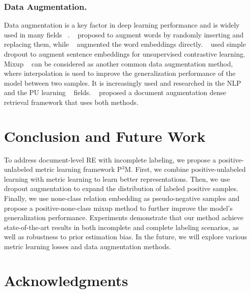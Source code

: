 \documentclass[letterpaper]{article} %
\begin{document}
\subsubsection{Data Augmentation.}
Data augmentation is a key factor in deep learning performance and is widely used in many fields ~\cite{DBLP:journals/jbd/ShortenK19,DBLP:conf/naacl/HedderichLASK21}. ~\cite{DBLP:conf/emnlp/WeiZ19,ma2019nlpaug} proposed to augment words by randomly inserting and replacing them, while ~\cite{DBLP:conf/acl/LeeKLH20} augmented the word embeddings directly. ~\cite{DBLP:conf/emnlp/GaoYC21} used simple dropout to augment sentence embeddings for unsupervised contrastive learning. Mixup ~\cite{DBLP:conf/iclr/ZhangCDL18,DBLP:conf/icml/VermaLBNMLB19} can be considered as another common data augmentation method, where interpolation is used to improve the generalization performance of the model between two samples. It is increasingly used and researched in the NLP ~\cite{DBLP:conf/acl/ChenYY20,DBLP:conf/acl/YinWQX21,DBLP:conf/naacl/WuX0ZMXZ22} and the PU learning ~\cite{DBLP:conf/nips/ChenLWZW20,DBLP:journals/corr/abs-2004-09388,DBLP:conf/iclr/LiLFO22,DBLP:conf/cvpr/ZhaoXJWH22} fields. ~\cite{DBLP:conf/acl/JeongBCHP22} proposed a document augmentation dense retrieval framework that uses both methods.

\section{Conclusion and Future Work}

To address document-level RE with incomplete labeling, we propose a positive-unlabeled metric learning framework P$^{3}$M. First, we combine positive-unlabeled learning with metric learning to learn better representations. Then, we use dropout augmentation to expand the distribution of labeled positive samples. Finally, we use none-class relation embedding as pseudo-negative samples and propose a positive-none-class mixup method to further improve the model's generalization performance. Experiments demonstrate that our method achieve state-of-the-art results in both incomplete and complete labeling scenarios, as well as robustness to prior estimation bias. In the future, we will explore various metric learning losses and data augmentation methods.

\section{Acknowledgments}
\end{document}

